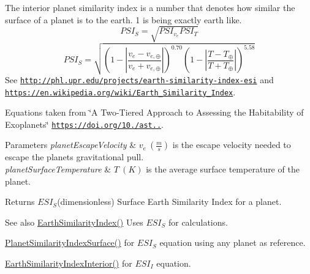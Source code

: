 The interior planet similarity index is a number that denotes how similar the surface of a planet is to the earth. 1 is being exactly earth like. \[PSI_S=\sqrt{PSI_{v_e} PSI_T}\] \[PSI_S=\sqrt{\left ( 1 - \left | \frac{v_e-v_{e,\oplus}}{v_e+v_{e,\oplus}} \right | \right )^{0.70} \left ( 1 - \left | \frac{T-T_{\oplus}}{T+T_{\oplus}} \right | \right )^{5.58}}\] See \href{http://phl.upr.edu/projects/earth-similarity-index-esi}{\tt http\+://phl.\+upr.\+edu/projects/earth-\/similarity-\/index-\/esi} and \href{https://en.wikipedia.org/wiki/Earth_Similarity_Index}{\tt https\+://en.\+wikipedia.\+org/wiki/\+Earth\+\_\+\+Similarity\+\_\+\+Index}.

Equations taken from \char`\"{}\+A Two-\/\+Tiered Approach to Assessing the Habitability of Exoplanets\char`\"{} \href{https://doi.org/10.1089/ast.2010.0592}{\tt https\+://doi.\+org/10./ast..}.


\begin{DoxyParams}{Parameters}
{\em planet\+Escape\+Velocity} & $v_e\ (\frac{m}{s})$ is the escape velocity needed to escape the planet\textquotesingle{}s gravitational pull. \\
\hline
{\em planet\+Surface\+Temperature} & $T\ (K)$ is the average surface temperature of the planet. \\
\hline
\end{DoxyParams}
\begin{DoxyReturn}{Returns}
$ESI_S$(dimensionless) Surface Earth Similarity Index for a planet. 
\end{DoxyReturn}
\begin{DoxySeeAlso}{See also}
\mbox{\hyperlink{group___e_g_x_phys-_planet_criteria_ga4b86397b1c839c49ac599d49fda207d4}{Earth\+Similarity\+Index()}} Uses $ESI_S$ for calculations. 

\mbox{\hyperlink{group___e_g_x_phys-_planet_criteria_gae0c7dce2779d66b0560ca388a34ddc39}{Planet\+Similarity\+Index\+Surface()}} for $ESI_S$ equation using any planet as reference. 

\mbox{\hyperlink{group___e_g_x_phys-_planet_criteria_ga699bcc2f17b8855eaa856595d8032f61}{Earth\+Similarity\+Index\+Interior()}} for $ESI_I$ equation. 
\end{DoxySeeAlso}
\mbox{\label{group___e_g_x_phys-_planet_criteria_ga62e8b781c301df60bd04af3183a965eb}} 
